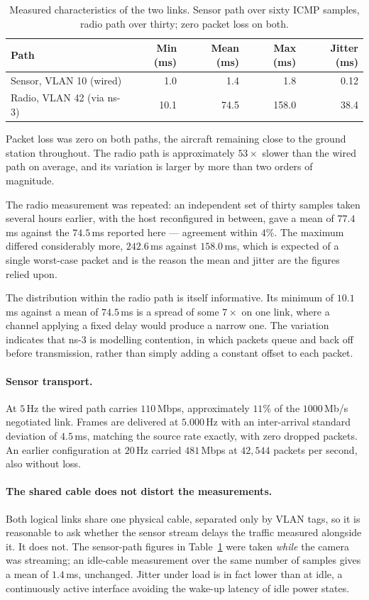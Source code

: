 \begin{table}[htbp]
\centering
\caption{Measured characteristics of the two links. Sensor path over sixty
ICMP samples, radio path over thirty; zero packet loss on both.}
\label{tab:hitl-links}
\begin{tabular}{lrrrr}
\toprule
Path & Min (ms) & Mean (ms) & Max (ms) & Jitter (ms) \\
\midrule
Sensor, VLAN 10 (wired)   & 1.0  & 1.4  & 1.8   & 0.12 \\
Radio, VLAN 42 (via ns-3) & 10.1 & 74.5 & 158.0 & 38.4 \\
\bottomrule
\end{tabular}
\end{table}

Packet loss was zero on both paths, the aircraft remaining close to the ground
station throughout. The radio path is approximately \(53\times\) slower than the
wired path on average, and its variation is larger by more than two orders of
magnitude.

The radio measurement was repeated: an independent set of thirty samples taken
several hours earlier, with the host reconfigured in between, gave a mean of
\(77.4\)\,ms against the \(74.5\)\,ms reported here --- agreement within
\(4\%\). The maximum differed considerably more, \(242.6\)\,ms against
\(158.0\)\,ms, which is expected of a single worst-case packet and is the
reason the mean and jitter are the figures relied upon.

The distribution within the radio path is itself informative. Its minimum of
\(10.1\)\,ms against a mean of \(74.5\)\,ms is a spread of some \(7\times\) on
one link, where a channel applying a fixed delay would produce a narrow one.
The variation indicates that ns-3 is modelling contention, in which packets
queue and back off before transmission, rather than simply adding a constant
offset to each packet.

\paragraph{Sensor transport.}
At \(5\)\,Hz the wired path carries \(110\)\,Mbps, approximately \(11\%\) of
the \(1000\)\,Mb/s negotiated link. Frames are delivered at \(5.000\)\,Hz with
an inter-arrival standard deviation of \(4.5\)\,ms, matching the source rate
exactly, with zero dropped packets. An earlier configuration at \(20\)\,Hz
carried \(481\)\,Mbps at \(42{,}544\) packets per second, also without loss.

\paragraph{The shared cable does not distort the measurements.}
Both logical links share one physical cable, separated only by VLAN tags, so
it is reasonable to ask whether the sensor stream delays the traffic measured
alongside it. It does not. The sensor-path figures in
Table~\ref{tab:hitl-links} were taken \emph{while} the camera was streaming;
an idle-cable measurement over the same number of samples gives a mean of
\(1.4\)\,ms, unchanged. Jitter under load is in fact lower than at idle, a
continuously active interface avoiding the wake-up latency of idle power
states.

